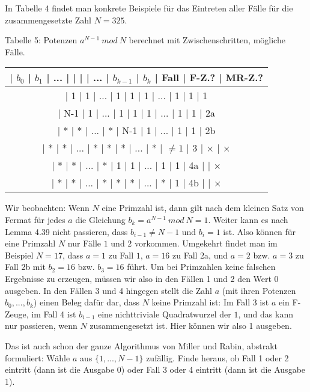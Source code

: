 \documentclass[a4paper]{article}
\begin{document}
\begin{multicols}{3}
        In Tabelle 4 findet man konkrete Beispiele für das Eintreten aller Fälle für die zusammengesetzte Zahl $N=325$.

        Tabelle 5: Potenzen $a^{N-1}\ mod\ N$ berechnet mit Zwischenschritten, mögliche Fälle.
        \begin{tabular}{c}
            | $b_0$ | $b_1$ | ... |   |   |   | ... | $b_{k-1}$ | $b_k$   | Fall | F-Z.?  | MR-Z.? \\\hline
            | 1   | 1   | ... | 1  | 1  | 1  | ... | 1     | 1     | 1                             \\
            | N-1  | 1   | ... | 1  | 1  | 1  | ... | 1     | 1     | 2a                           \\
            | *   | *   | ... | *  | N-1 | 1  | ... | 1     | 1     | 2b                           \\
            | *   | *   | ... | *  | *  | *  | ... | *     | $\not= 1$ | 3  | $\times$ | $\times$  \\
            | *   | *   | ... | *  | 1  | 1  | ... | 1     | 1     | 4a  |     | $\times$          \\
            | *   | *   | ... | *  | *  | *  | ... | *     | 1     | 4b  |     | $\times$
        \end{tabular}

        Wir beobachten: Wenn $N$ eine Primzahl ist, dann gilt nach dem kleinen Satz von Fermat für jedes $a$ die Gleichung $b_k=a^{N-1}\ mod\ N=1$. Weiter kann es nach Lemma 4.39 nicht passieren, dass $b_{i-1}\not=N-1$ und $b_i=1$ ist. Also können für eine Primzahl $N$ nur Fälle $1$ und $2$ vorkommen. Umgekehrt findet man im Beispiel $N=17$, dass $a=1$ zu Fall $1$, $a=16$ zu Fall 2a, und $a=2$ bzw. $a=3$ zu Fall 2b mit $b_2=16$ bzw. $b_3=16$ führt. Um bei Primzahlen keine falschen Ergebnisse zu erzeugen, müssen wir also in den Fällen 1 und 2 den Wert 0 ausgeben. In den Fällen 3 und 4 hingegen stellt die Zahl $a$ (mit ihren Potenzen $b_0,...,b_k$) einen Beleg dafür dar, dass $N$ keine Primzahl ist: Im Fall 3 ist $a$ ein F-Zeuge, im Fall 4 ist $b_{i-1}$ eine nichttriviale Quadratwurzel der $1$, und das kann nur passieren, wenn $N$ zusammengesetzt ist. Hier können wir also 1 ausgeben.

        Das ist auch schon der ganze Algorithmus von Miller und Rabin, abstrakt formuliert: Wähle $a$ aus $\{1,...,N-1\}$ zufällig. Finde heraus, ob Fall 1 oder 2 eintritt (dann ist die Ausgabe 0) oder Fall 3 oder 4 eintritt (dann ist die Ausgabe 1).


\end{multicols}
\end{document}
